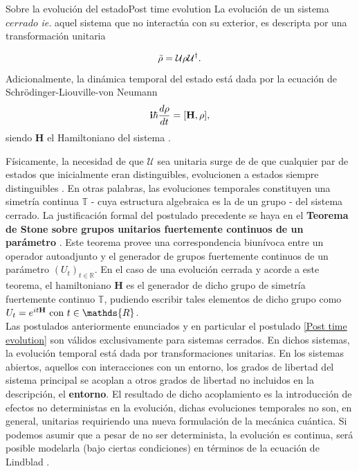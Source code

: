\documentclass{report} %
\newcommand{\ie}{\textit{ie. }}
\numberwithin{equation}{section}
\begin{document}
\begin{post}{Sobre la evolución del estado}{Post time evolution}
La evolución de un sistema $cerrado$ \ie aquel sistema que no interactúa con su exterior, es descripta por una transformación unitaria 

\begin{equation}
    \Tilde{\rho} = \mathcal{U} \rho \mathcal{U}^{\dagger}.
    \label{state evolution}
\end{equation}
 Adicionalmente, la dinámica temporal del estado está dada por la ecuación de Schrödinger-Liouville-von Neumann 
 \begin{equation}
     {\bf i}\hbar \frac{d\rho}{dt} = [\mathbf{H},\rho],
     \label{Liouville eq}
 \end{equation}
  siendo $\mathbf{H}$ el Hamiltoniano del sistema \cite{HeinzPetruccione,PATHRIA2011115}.
  \label{Post time evolution}
\end{post}

Físicamente, la necesidad de que $\mathcal{U}$ sea unitaria surge de de que cualquier par de estados que inicialmente eran distinguibles, evolucionen a estados siempre distinguibles
\cite{Nielsen.00,CohenTannoudji1989}. En otras palabras, las evoluciones temporales constituyen una simetría continua $\mathbb{T}$ - cuya estructura algebraica es la de un grupo - del sistema cerrado. La justificación formal del postulado precedente se haya en el \textbf{Teorema de Stone sobre grupos unitarios fuertemente continuos de un parámetro} \cite{HoracioI, GoldbartStone, BCHallp}. Este teorema provee una correspondencia biunívoca entre un operador autoadjunto y el generador de grupos fuertemente continuos de un parámetro $(U_t)_{t \in \mathds{R}}$. En el caso de una evolución cerrada y acorde a este teorema, el hamiltoniano $\mathbf{H}$ es el generador de dicho grupo de simetría fuertemente continuo $\mathbb{T}$, pudiendo escribir tales elementos de dicho grupo como $U_t = e^{i t \mathbf{H}}\textnormal{ con } t \in \mathds{R}$. \\

Las postulados anteriormente enunciados y en particular el postulado \ref{Post time evolution} son válidos exclusivamente para sistemas cerrados. En dichos sistemas, la evolución temporal está dada por transformaciones unitarias. En los sistemas abiertos, aquellos con interacciones con un entorno, los grados de libertad del sistema principal se acoplan a otros grados de libertad no incluidos en la descripción, el \textbf{entorno}. El resultado de dicho acoplamiento es la introducción de efectos no deterministas en la evolución, dichas evoluciones temporales no son, en general, unitarias requiriendo una nueva formulación de la mecánica cuántica. Si podemos asumir que a pesar de no ser determinista, la evolución es continua, será posible modelarla (bajo ciertas condiciones) en términos de la ecuación de Lindblad \cite{HeinzPetruccione}\cite{Lindblad1976}.
\end{document}

